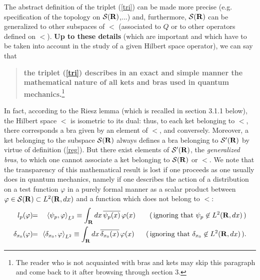 \documentclass[12pt]{report}
\begin{document}
The abstract definition of the triplet (\ref{tri}) 
can be made more precise (e.g. specification of the 
topology on ${\cal S}({\bf R})$,...) and,  
furthermore, ${\cal S}({\bf R})$ can be generalized to other 
subspaces of $\lt$ 
(associated to $Q$ or to other operators defined on 
$\lt$). 
{\bf Up to these details} (which are important and 
which have to be taken 
into account in the study of 
a given Hilbert space operator), 
we can say that
\begin{quote}
{\bf the triplet (\ref{tri})
describes in an exact and simple manner the mathematical nature 
of all kets and bras used 
in quantum mechanics.}\footnote{The reader who is not acquainted 
with bras and kets may skip this paragraph 
and come back to it after browsing through section 3.}  
\end{quote}
   In fact, according to the Riesz lemma (which is 
recalled in section 3.1.1 below), 
the Hilbert space $\lt$ is isometric  
to its dual: thus, to each ket 
belonging to $\lt$, there corresponds a bra 
given by an element of $\lt$,
and conversely. 
Moreover, a ket belonging to the subspace ${\cal S}({\bf R})$ always defines a bra
belonging to ${\cal S}^{\prime} ({\bf R})$ by virtue of definition (\ref{reg}).
But there exist elements of ${\cal S}^{\prime} ({\bf R})$, the {\em generalized bras}, 
to which one cannot associate a ket belonging to ${\cal S}({\bf R})$ or $\lt$.
We note that the transparency of this mathematical result 
is lost if one proceeds as one 
usually does in quantum mechanics, namely if one 
describes the action 
of a distribution on a test function $\varphi$ in a purely formal 
manner as a scalar product between 
$\varphi \in {\cal S}({\bf R}) \subset {L^2 ({{\bf R}},dx)}$
and a function which does not belong to $\lt$:
\begin{eqnarray}
\nonumber 
l_p (\varphi ) 
\! & \! = \! & \! 
\left\langle \psi_p ,\varphi \right\rangle _{L^2}
\equiv \int_{\br} dx \, \overline{\psi_p (x)} \, \varphi (x)
\qquad (\, \mbox{ignoring that}\ \psi_p \not \in \lt \,)
\\
\label{ign}
\delta_{x_0} (\varphi )
\! & \! = \! & \! 
\left\langle \delta_{x_0} , \varphi \right\rangle _{L^2}
\equiv \int_{\br} dx \, \overline{\delta_{x_0} (x)} \, \varphi (x)
\quad
\ \ (\, \mbox{ignoring that}\ \delta_{x_0} \not \in \lt \,).
\end{eqnarray}
 
\end{document}
